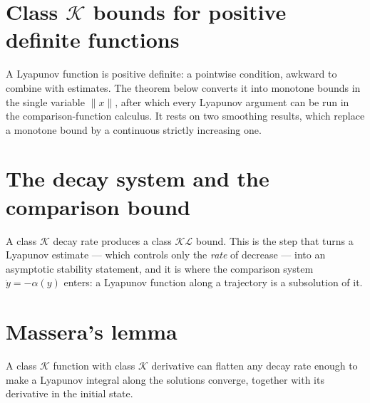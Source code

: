 

\section{Class \texorpdfstring{$\mathcal{K}$}{K} bounds for positive definite functions}

A Lyapunov function is positive definite: a pointwise condition, awkward to combine with
estimates. The theorem below converts it into monotone bounds in the single variable $\|x\|$,
after which every Lyapunov argument can be run in the comparison-function calculus. It rests on
two smoothing results, which replace a monotone bound by a continuous strictly increasing one.





\section{The decay system and the comparison bound}

A class $\mathcal{K}$ decay rate produces a class $\mathcal{KL}$ bound. This is the step that
turns a Lyapunov estimate — which controls only the \emph{rate} of decrease — into an asymptotic
stability statement, and it is where the comparison system $\dot y = -\alpha(y)$ enters: a
Lyapunov function along a trajectory is a subsolution of it.






\section{Massera's lemma}

A class $\mathcal{K}$ function with class $\mathcal{K}$ derivative can flatten any decay rate
enough to make a Lyapunov integral along the solutions converge, together with its derivative
in the initial state.

